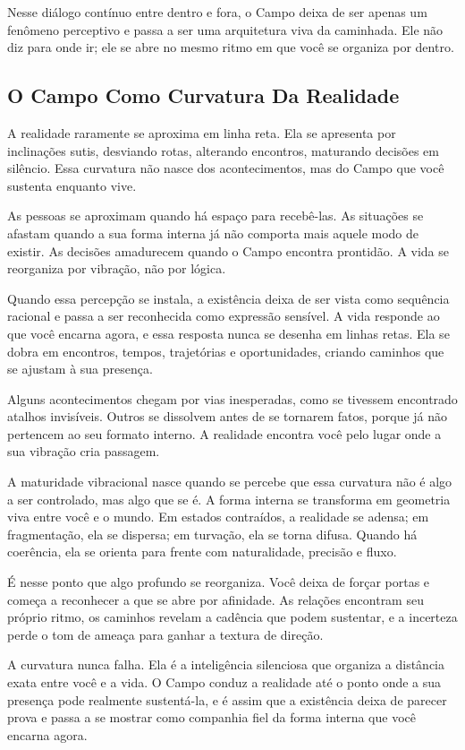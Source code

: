 \documentclass[12pt]{book}
\begin{document}
Nesse diálogo contínuo entre dentro e fora, o Campo deixa de ser apenas um fenômeno perceptivo e passa a ser uma arquitetura viva da caminhada. Ele não diz para onde ir; ele se abre no mesmo ritmo em que você se organiza por dentro.

\subsection*{O Campo Como Curvatura Da Realidade}

A realidade raramente se aproxima em linha reta. Ela se apresenta por inclinações sutis, desviando rotas, alterando encontros, maturando decisões em silêncio. Essa curvatura não nasce dos acontecimentos, mas do Campo que você sustenta enquanto vive.

As pessoas se aproximam quando há espaço para recebê-las. As situações se afastam quando a sua forma interna já não comporta mais aquele modo de existir. As decisões amadurecem quando o Campo encontra prontidão. A vida se reorganiza por vibração, não por lógica.

Quando essa percepção se instala, a existência deixa de ser vista como sequência racional e passa a ser reconhecida como expressão sensível. A vida responde ao que você encarna agora, e essa resposta nunca se desenha em linhas retas. Ela se dobra em encontros, tempos, trajetórias e oportunidades, criando caminhos que se ajustam à sua presença.

Alguns acontecimentos chegam por vias inesperadas, como se tivessem encontrado atalhos invisíveis. Outros se dissolvem antes de se tornarem fatos, porque já não pertencem ao seu formato interno. A realidade encontra você pelo lugar onde a sua vibração cria passagem.

A maturidade vibracional nasce quando se percebe que essa curvatura não é algo a ser controlado, mas algo que se é. A forma interna se transforma em geometria viva entre você e o mundo. Em estados contraídos, a realidade se adensa; em fragmentação, ela se dispersa; em turvação, ela se torna difusa. Quando há coerência, ela se orienta para frente com naturalidade, precisão e fluxo.

É nesse ponto que algo profundo se reorganiza. Você deixa de forçar portas e começa a reconhecer a que se abre por afinidade. As relações encontram seu próprio ritmo, os caminhos revelam a cadência que podem sustentar, e a incerteza perde o tom de ameaça para ganhar a textura de direção.

A curvatura nunca falha. Ela é a inteligência silenciosa que organiza a distância exata entre você e a vida. O Campo conduz a realidade até o ponto onde a sua presença pode realmente sustentá-la, e é assim que a existência deixa de parecer prova e passa a se mostrar como companhia fiel da forma interna que você encarna agora.
\end{document}
